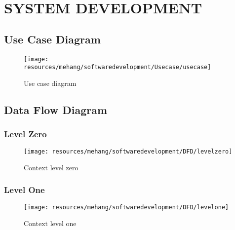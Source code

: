 \newpage
\section{SYSTEM DEVELOPMENT}
\subsection{Use Case Diagram}
\begin{figure}[h!]
        \centering
        \texttt{[image: resources/mehang/softwaredevelopment/Usecase/usecase]}
        \caption{Use case diagram}
\end{figure}
\newpage
\subsection{Data Flow Diagram}
\subsubsection{Level Zero}
\begin{figure}[h!]
        \centering
        \texttt{[image: resources/mehang/softwaredevelopment/DFD/levelzero]}
        \caption{Context level zero}
        \label{fig:contextlevel}
\end{figure}
\newpage
\subsubsection{Level One}
\begin{figure}[h!]
        \texttt{[image: resources/mehang/softwaredevelopment/DFD/levelone]}
        \caption{Context level one}
        \label{fig:level1b}
\end{figure}
